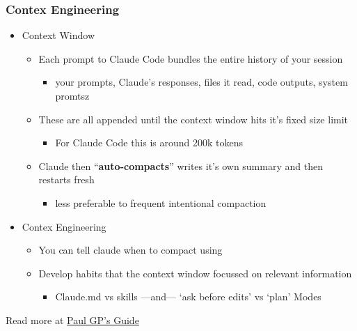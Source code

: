 \documentclass[aspectratio=169, 12pt]{beamer}
\begin{document}
\begin{frame}
\frametitle{Contex Engineering}

\begin{itemize}
    \item Context Window
    \begin{itemize}
        \item Each prompt to Claude Code bundles the entire history of your session
            \begin{itemize}
                \item your prompts, Claude’s responses, files it read, code outputs, system promtsz
            \end{itemize}
        \item These are all appended until the context window hits it's fixed size limit
        \begin{itemize}
            \item For Claude Code this is around 200k tokens
        \end{itemize}
        \item Claude then ``{\bf auto-compacts}'' writes it's own summary and then restarts fresh        
        \begin{itemize}
            \item less preferable to frequent intentional compaction
        \end{itemize}
    \end{itemize}
    \vspace{.05in}
    \item Contex Engineering
    \begin{itemize}
        \item You can tell claude when to compact using 
        \item Develop habits that the context window focussed on relevant information
        \begin{itemize}
        \item Claude.md vs skills ---and--- `ask before edits' vs `plan' Modes 
        \end{itemize}
    \end{itemize}
    \vspace{.05in}
    \end{itemize}
    \vfill\footnotesize
    Read more at \href{https://paulgp.substack.com/i/192433164/what-is-a-context-window-and-how-does-it-work}{Paul GP's Guide} 
\end{frame}
\end{document}
